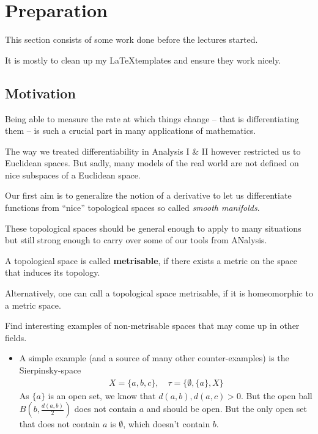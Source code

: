 
\section{Preparation}

This section consists of some work done before the lectures started.

It is mostly to clean up my \LaTeX templates and ensure they work nicely.

\subsection{Motivation}

Being able to measure the rate at which things change -- that is differentiating them -- is such a crucial part in many applications of mathematics.

The way we treated differentiability in Analysis I \& II however restricted us to Euclidean spaces.
But sadly, many models of the real world are not defined on nice subspaces of a Euclidean space.

Our first aim is to generalize the notion of a derivative to let us differentiate functions from ``nice'' topological spaces so called \emph{smooth manifolds}.

These topological spaces should be general enough to apply to many situations but still strong enough to carry over some of our tools from ANalysis.


\begin{dfn}[]
  A topological space is called \textbf{metrisable}, if there exists a metric on the space that induces its topology.
\end{dfn}

Alternatively, one can call a topological space metrisable, if it is homeomorphic to a metric space.

\begin{ex}[]
  Find interesting examples of non-metrisable spaces that may come up in other fields.
\end{ex}
\begin{itemize}
  \item A simple example (and a source of many other counter-examples) is the Sierpinsky-space
    \begin{align*}
      X = \{a,b,c\}, \quad \tau = \{\emptyset, \{a\},X\}
    \end{align*}
    As $\{a\}$ is an open set, we know that $d(a,b), d(a,c) >0$.
    But the open ball $B(b, \frac{d(a,b)}{2})$ does not contain $a$ and should be open.
    But the only open set that does not contain $a$ is $\emptyset$, which doesn't contain $b$.

\end{itemize}


